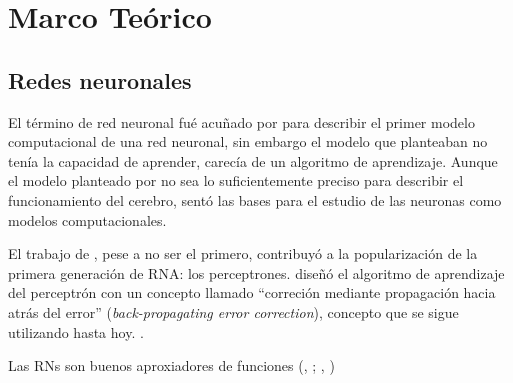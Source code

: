 \chapter{Marco Teórico}
\thispagestyle{empty}

\section{Redes neuronales}
El término de red neuronal fué acuñado por \citet{McCulloch1943}
para describir el primer modelo computacional de una red neuronal, sin embargo el modelo que planteaban no tenía la capacidad de aprender, carecía de un algoritmo de aprendizaje. Aunque el modelo planteado por \citeauthor{McCulloch1943} no sea lo suficientemente preciso para describir el funcionamiento del cerebro, sentó las bases para el estudio de las neuronas como modelos computacionales.


El trabajo de \citet{Rosenblatt1957}, pese a no ser el primero, contribuyó a la popularización de la primera generación de RNA: los perceptrones. \citeauthor{Rosenblatt1957} diseñó el algoritmo de aprendizaje del perceptrón con un concepto llamado ``correción mediante propagación hacia atrás del error'' (\textit{back-propagating error correction}), concepto que se sigue utilizando hasta hoy. \citep{Rumelhart1986}.

Las RNs son buenos aproxiadores de funciones (\citeauthor{Hornik1989}, \citeyear{Hornik1989}; \citeauthor{Cybenko1989}, \citeyear{Cybenko1989})









